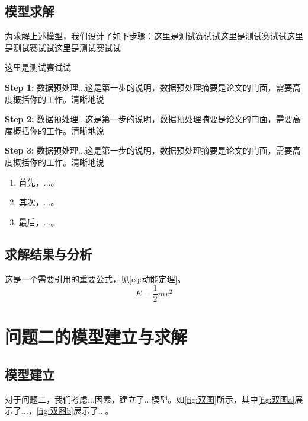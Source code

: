 \documentclass[withoutpreface,notoc]{cumcmthesis}
\begin{document}
	\subsection{模型求解}
	    为求解上述模型，我们设计了如下步骤：这里是测试赛试试这里是测试赛试试这里是测试赛试试这里是测试赛试试

        这里是测试赛试试


        \textbf{Step 1:} 数据预处理...这是第一步的说明，数据预处理摘要是论文的门面，需要高度概括你的工作。清晰地说

        \textbf{Step 2:} 数据预处理...这是第一步的说明，数据预处理摘要是论文的门面，需要高度概括你的工作。清晰地说

        \textbf{Step 3:} 数据预处理...这是第一步的说明，数据预处理摘要是论文的门面，需要高度概括你的工作。清晰地说

    \begin{enumerate}
        \item 首先，...。
        \item 其次，...。
        \item 最后，...。
    \end{enumerate}


	\subsection{求解结果与分析}

	这是一个需要引用的重要公式，见\cref{eq:动能定理}。
	\begin{equation}
		\label{eq:动能定理}
		E = \frac{1}{2}mv^2
	\end{equation}
	
	\section{问题二的模型建立与求解}
	\subsection{模型建立}
	对于问题二，我们考虑...因素，建立了...模型。如\cref{fig:双图}所示，其中\cref{fig:双图a}展示了...，\cref{fig:双图b}展示了...。
	
\end{document}
